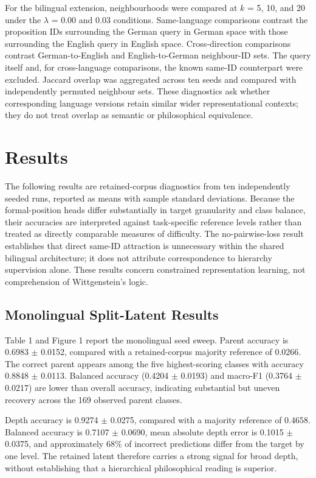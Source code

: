 \documentclass[webpdf,modern,medium,namedate]{oup-authoring-template}
\begin{document}
For the bilingual extension, neighbourhoods were compared at $k$ = 5, 10, and 20 under the $\lambda$ = 0.00 and 0.03 conditions. Same-language comparisons contrast the proposition IDs surrounding the German query in German space with those surrounding the English query in English space. Cross-direction comparisons contrast German-to-English and English-to-German neighbour-ID sets. The query itself and, for cross-language comparisons, the known same-ID counterpart were excluded. Jaccard overlap was aggregated across ten seeds and compared with independently permuted neighbour sets. These diagnostics ask whether corresponding language versions retain similar wider representational contexts; they do not treat overlap as semantic or philosophical equivalence.

\section{Results}
The following results are retained-corpus diagnostics from ten independently seeded runs, reported as means with sample standard deviations. Because the formal-position heads differ substantially in target granularity and class balance, their accuracies are interpreted against task-specific reference levels rather than treated as directly comparable measures of difficulty. The no-pairwise-loss result establishes that direct same-ID attraction is unnecessary within the shared bilingual architecture; it does not attribute correspondence to hierarchy supervision alone. These results concern constrained representation learning, not comprehension of Wittgenstein's logic.

\subsection{Monolingual Split-Latent Results}
Table 1 and Figure 1 report the monolingual seed sweep. Parent accuracy is 0.6983 $\pm$ 0.0152, compared with a retained-corpus majority reference of 0.0266. The correct parent appears among the five highest-scoring classes with accuracy 0.8848 $\pm$ 0.0113. Balanced accuracy (0.4204 $\pm$ 0.0193) and macro-F1 (0.3764 $\pm$ 0.0217) are lower than overall accuracy, indicating substantial but uneven recovery across the 169 observed parent classes.

Depth accuracy is 0.9274 $\pm$ 0.0275, compared with a majority reference of 0.4658. Balanced accuracy is 0.7107 $\pm$ 0.0690, mean absolute depth error is 0.1015 $\pm$ 0.0375, and approximately 68\% of incorrect predictions differ from the target by one level. The retained latent therefore carries a strong signal for broad depth, without establishing that a hierarchical philosophical reading is superior.
\end{document}
